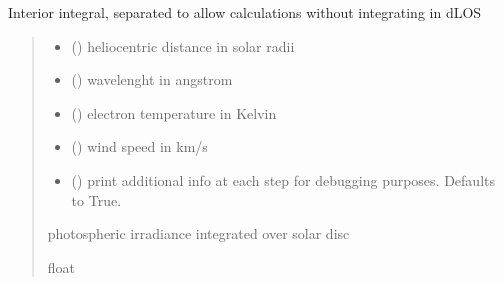\documentclass[letterpaper,10pt,english]{sphinxmanual}
\begin{document}
\begin{fulllineitems}
\label{\detokenize{doppler_dimming_lib:doppler_dimming_lib.integrals.I_dl_domega_dphi}}
\pysigstartsignatures
{}
\pysigstopsignatures
\sphinxAtStartPar
Interior integral, separated to allow calculations without integrating in dLOS
\begin{quote}\begin{description}
\begin{itemize}
\item {} 
\sphinxAtStartPar
{} () \textendash{} heliocentric distance in solar radii

\item {} 
\sphinxAtStartPar
{} () \textendash{} wavelenght in angstrom

\item {} 
\sphinxAtStartPar
{} () \textendash{} electron temperature in Kelvin

\item {} 
\sphinxAtStartPar
{} () \textendash{} wind speed in km/s

\item {} 
\sphinxAtStartPar
{} (\sphinxstyleliteralemphasis{\sphinxupquote{, }}) \textendash{} print additional info at each step for debugging purposes. Defaults to True.

\end{itemize}

\sphinxAtStartPar
photospheric irradiance integrated over solar disc

\sphinxAtStartPar
float

\end{description}\end{quote}

\end{fulllineitems}
\end{document}

